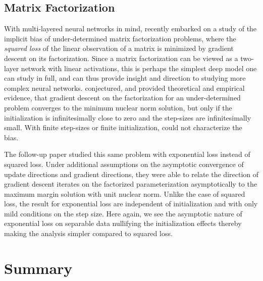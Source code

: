 \documentclass[twoside,11pt,english]{article}
\newcommand{\remove}[1]{}
\newcommand{\dnote}[1]{{[\color{blue}Daniel: #1]}}
\begin{document}
\subsection{Matrix Factorization}

With multi-layered neural networks in mind, \citet{Gunasekar2017}
recently embarked on a study of the implicit bias of under-determined
matrix factorization problems, where the {\em squared
loss} of the linear observation of a matrix is minimized by gradient descent on its
factorization. Since a matrix factorization can be viewed as a two-layer
network with linear activations, this is perhaps the simplest deep
model one can study in full, and can thus provide insight and direction
to studying more complex neural networks. \citeauthor{Gunasekar2017}
conjectured, and provided theoretical and empirical evidence, that
gradient descent on the factorization for an under-determined problem
converges to the minimum nuclear norm solution, but only if the initialization
is infinitesimally close to zero and the step-sizes are infinitesimally
small. With finite step-sizes or finite initialization, \citeauthor{Gunasekar2017}
could not characterize the bias. 

The follow-up paper \citep{gunasekar2018characterizing} studied this same problem with exponential loss instead of squared loss. Under additional assumptions on the asymptotic convergence of update directions and gradient directions, they were able to relate the direction of gradient descent iterates on the factorized parameterization asymptotically to the  maximum margin solution with unit nuclear norm. Unlike the case of squared loss, the result for exponential loss are independent of initialization and with only mild  conditions on the step size. Here again, we see the asymptotic nature of exponential loss on separable data nullifying the initialization effects thereby making the analysis simpler compared to squared loss. 
\remove{
Beyond
the practical relevance of the logistic loss, taking our approach
has the advantage that because of its asymptotic nature, it does not
depend on the initialization and step-size. It thus might prove easier
to analyze logistic regression on a matrix factorization instead of
the least square problem, providing significant insight into the implicit
biases of gradient descent on non-convex multi-layered optimization. \dnote{maybe add forward citation to ICML paper here?}
}


\section{Summary}
\end{document}
